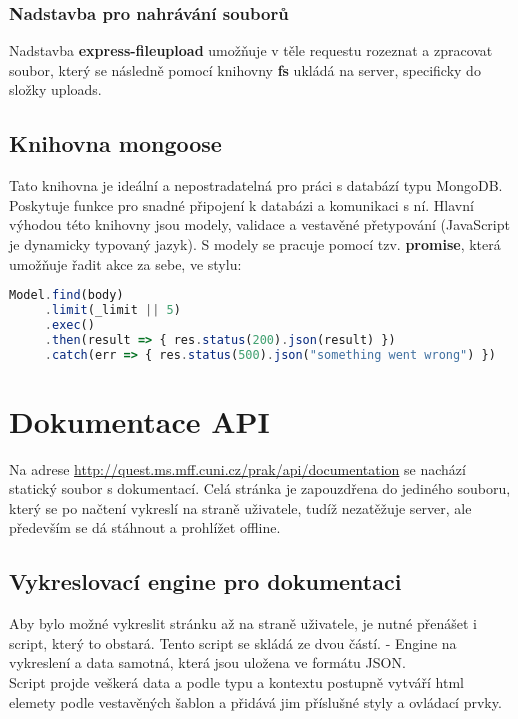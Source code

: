 \subsubsection{Nadstavba pro nahrávání souborů}
Nadstavba \textbf{express-fileupload} umožňuje v těle requestu rozeznat a
zpracovat soubor, který se následně pomocí knihovny \textbf{fs} ukládá na
server, specificky do složky uploads.

\subsection{Knihovna mongoose}
Tato knihovna je ideální a nepostradatelná pro práci s databází typu MongoDB.
Poskytuje funkce pro snadné připojení k databázi a komunikaci s ní.
Hlavní výhodou této knihovny jsou modely, validace a vestavěné přetypování
(JavaScript je dynamicky typovaný jazyk). 
S modely se pracuje pomocí tzv. \textbf{promise}, která umožňuje řadit
akce za sebe, ve stylu:
\begin{lstlisting}[language=JavaScript]
Model.find(body)
     .limit(_limit || 5)
     .exec()
     .then(result => { res.status(200).json(result) })
     .catch(err => { res.status(500).json("something went wrong") })
\end{lstlisting}

\section{Dokumentace API}
Na adrese \url{http://quest.ms.mff.cuni.cz/prak/api/documentation}
se nachází statický soubor s dokumentací.
Celá stránka je zapouzdřena do jediného souboru, který se po načtení 
vykreslí na straně uživatele, tudíž nezatěžuje server, ale
především se dá stáhnout a prohlížet offline.

\subsection{Vykreslovací engine pro dokumentaci}
Aby bylo možné vykreslit stránku až na straně uživatele,
je nutné přenášet i script, který to obstará. Tento script se skládá ze dvou částí. -
Engine na vykreslení a data samotná, která jsou uložena ve formátu JSON.\\
Script projde veškerá data a podle typu a kontextu postupně vytváří
html elemety podle vestavěných šablon a přidává jim příslušné styly a ovládací prvky.


